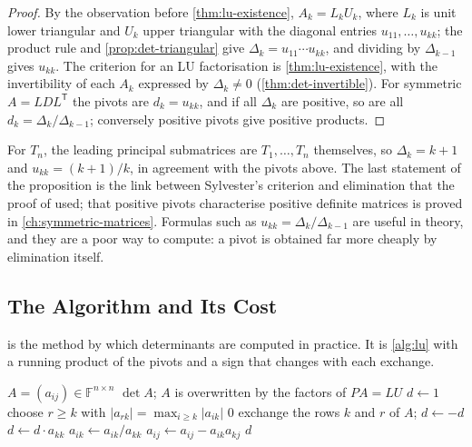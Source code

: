 \begin{proof}
By the observation before \cref{thm:lu-existence}, $A_k=L_kU_k$, where $L_k$ is unit lower triangular and $U_k$ upper triangular with the diagonal entries $u_{11},\ldots,u_{kk}$; the product rule and \cref{prop:det-triangular} give $\Delta_k=u_{11}\cdots u_{kk}$, and dividing by $\Delta_{k-1}$ gives $u_{kk}$. The criterion for an LU factorisation is \cref{thm:lu-existence}, with the invertibility of each $A_k$ expressed by $\Delta_k\ne0$ (\cref{thm:det-invertible}). For symmetric $A=LDL^{\mathsf T}$ the pivots are $d_k=u_{kk}$, and if all $\Delta_k$ are positive, so are all $d_k=\Delta_k/\Delta_{k-1}$; conversely positive pivots give positive products.
\end{proof}

For $T_n$, the leading principal submatrices are $T_1,\ldots,T_n$ themselves, so $\Delta_k=k+1$ and $u_{kk}=(k+1)/k$, in agreement with the pivots above. The last statement of the proposition is the link between Sylvester's criterion and elimination that the proof of  used; that positive pivots characterise positive definite matrices is proved in \cref{ch:symmetric-matrices}. Formulas such as $u_{kk}=\Delta_k/\Delta_{k-1}$ are useful in theory, and they are a poor way to compute: a pivot is obtained far more cheaply by elimination itself.

\subsection{The Algorithm and Its Cost}

 is the method by which determinants are computed in practice. It is \cref{alg:lu} with a running product of the pivots and a sign that changes with each exchange.

\begin{algorithm}
\begin{algorithmic}[1]
\Require $A=(a_{ij})\in\mathbb F^{n\times n}$
\Ensure $\det A$; $A$ is overwritten by the factors of $PA=LU$
\State $d\gets1$
  \State choose $r\ge k$ with $|a_{rk}|=\max_{i\ge k}|a_{ik}|$
   
    \State \Return $0$
  \EndIf
    \State exchange the rows $k$ and $r$ of $A$; $d\gets-d$
  \EndIf
  \State $d\gets d\cdot a_{kk}$
    \State $a_{ik}\gets a_{ik}/a_{kk}$
      \State $a_{ij}\gets a_{ij}-a_{ik}a_{kj}$
    \EndFor
  \EndFor
\EndFor
\State \Return $d$
\end{algorithmic}
\caption{The determinant by Gaussian elimination with partial pivoting (\cref{thm:det-plu}). The work is that of \cref{alg:lu}, about $2n^3/3$ operations, plus one multiplication by each pivot.}
\label{alg:det-lu}
\end{algorithm}

